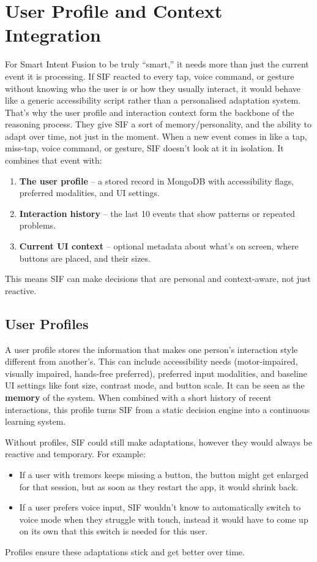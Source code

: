 \documentclass[openany]{book}
\begin{document}
\section{User Profile and Context Integration}
For Smart Intent Fusion to be truly “smart,” it needs more than just the current event it is processing. If SIF reacted to every tap, voice command, or gesture without knowing who the user is or how they usually interact, it would behave like a generic accessibility script rather than a personalised adaptation system. That’s why the user profile and interaction context form the backbone of the reasoning process. They give SIF a sort of memory/personality, and the ability to adapt over time, not just in the moment.
When a new event comes in like a tap, miss-tap, voice command, or gesture, SIF doesn’t look at it in isolation. It combines that event with:
\begin{enumerate}
    \item \textbf{The user profile} – a stored record in MongoDB with accessibility flags, preferred modalities, and UI settings.
    \item \textbf{Interaction history} – the last 10 events that show patterns or repeated problems.
    \item \textbf{Current UI context} – optional metadata about what’s on screen, where buttons are placed, and their sizes.
\end{enumerate}
This means SIF can make decisions that are personal and context-aware, not just reactive.

\subsection{User Profiles}
A user profile stores the information that makes one person’s interaction style different from another’s.
This can include accessibility needs (motor-impaired, visually impaired, hands-free preferred), preferred input modalities, and baseline UI settings like font size, contrast mode, and button scale. It can be seen as the \textbf{memory} of the system.
When combined with a short history of recent interactions, this profile turns SIF from a static decision engine into a continuous learning system. 

Without profiles, SIF could still make adaptations, however they would always be reactive and temporary.
For example:
\begin{itemize}
    \item If a user with tremors keeps missing a button, the button might get enlarged for that session, but as soon as they restart the app, it would shrink back.
    \item If a user prefers voice input, SIF wouldn’t know to automatically switch to voice mode when they struggle with touch, instead it would have to come up on its own that this switch is needed for this user.
\end{itemize}
Profiles ensure these adaptations stick and get better over time.
\end{document}

